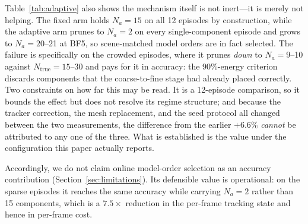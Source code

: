 Table~\ref{tab:adaptive} also shows the mechanism itself is not inert---it is
merely not helping.  The fixed arm holds $N_a=15$ on all 12 episodes by
construction, while the adaptive arm prunes to $N_a=2$ on every
single-component episode and grows to $N_a=20$--21 at BF5, so scene-matched
model orders are in fact selected.  The failure is specifically on the crowded
episodes, where it prunes \emph{down} to $N_a=9$--10 against
$N_{\text{true}}=15$--30 and pays for it in accuracy: the 90\%-energy
criterion discards components that the coarse-to-fine stage had already placed
correctly.
Two constraints on how far this may be read.  It is a 12-episode comparison,
so it bounds the effect but does not resolve its regime structure; and because
the tracker correction, the mesh replacement, and the seed protocol all changed
between the two measurements, the difference from the earlier $+6.6\%$
\emph{cannot} be attributed to any one of the three.  What is established is
the value under the configuration this paper actually reports.

Accordingly, we do not claim online model-order selection as an accuracy
contribution (Section~\ref{sec:limitations}).  Its defensible value is
operational: on the sparse episodes it reaches the same accuracy while carrying
$N_a=2$ rather than 15 components, which is a $7.5\times$ reduction in the
per-frame tracking state and hence in per-frame cost.

